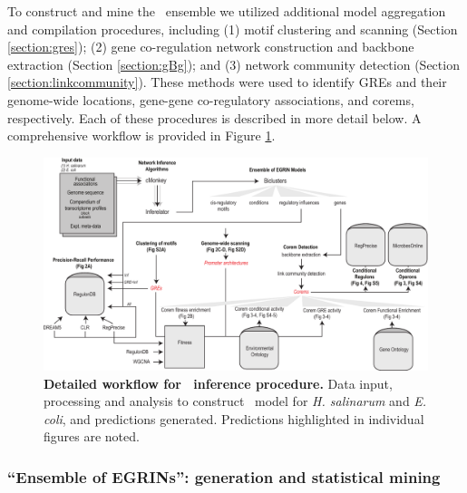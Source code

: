 To construct and mine the \egrine~ensemble we utilized additional
model aggregation and compilation procedures, including (1) motif
clustering \cite{vanDongen2012} and scanning \cite{Bailey1998}
(Section \ref{section:gres}); (2) gene co-regulation network
construction and backbone extraction \cite{Serrano2009}
(Section \ref{section:gBg}); and (3) network community
detection \cite{Ahn2010} (Section \ref{section:linkcommunity}). These
methods were used to identify GREs and their genome-wide locations,
gene-gene co-regulatory associations, and corems, respectively. Each
of these procedures is described in more detail below. A comprehensive
workflow is provided in Figure \ref{fig:workflow}.

\begin{figure}[hp]
\centering
\includegraphics[width=\linewidth]{figures/workflow.pdf}
\caption[Detailed workflow for \egrine~inference procedure]{
{\bf Detailed workflow for \egrine~inference procedure.} Data input,
processing and analysis to construct \egrine~model for {\it
H. salinarum} and {\it E. coli}, and predictions
generated. Predictions highlighted in individual figures are noted.}
\label{fig:workflow}
\end{figure}

\subsubsection{``Ensemble of EGRINs'': generation and statistical mining}

